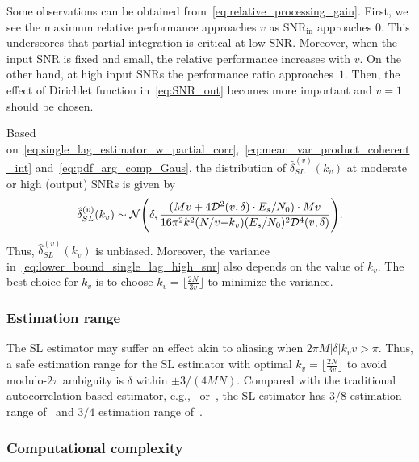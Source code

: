 Some observations can be obtained from~\eqref{eq:relative_processing_gain}.
First, we see the maximum relative performance approaches $v$ as
$\text{SNR}_{\text{in}}$ approaches 0.
This underscores that partial integration is critical at low SNR.
Moreover, when the input SNR is fixed and small, the relative performance
increases with $v$.
On the other hand, at high input SNRs the performance ratio approaches~$1$.
Then, the effect of Dirichlet function in~\eqref{eq:SNR_out}
becomes more important and
$v=1$ should be chosen.

Based on~\eqref{eq:single_lag_estimator_w_partial_corr},~\eqref{eq:mean_var_product_coherent_int}
and~\eqref{eq:pdf_arg_comp_Gaus},
the distribution of $\hat{\delta}_{SL}^{(v)}(k_v)$ at moderate or high
(output) SNRs is given by
\begin{equation}
  \label{eq:lower_bound_single_lag_high_snr}
  \hat{\delta}_{SL}^{(v)}(k_v) \sim \mathcal{N} \Bigg(\delta,\frac{(Mv+4\mathcal{D}^2(v,\delta)\cdot E_s/N_0)\cdot Mv}{16\pi^2k^2(N/v{-}k_v)(E_s/N_0)^2\mathcal{D}^4(v,\delta)}\Bigg).
\end{equation}
Thus, $\hat{\delta}_{SL}^{(v)}(k_v)$ is unbiased. 
Moreover, the variance in~\eqref{eq:lower_bound_single_lag_high_snr} also depends on
the value of $k_v$.
The best choice for $k_v$ is to choose 
$k_v=\lfloor\frac{2N}{3v}\rfloor$ to minimize the variance.

\subsubsection{Estimation range}
The SL estimator may suffer an effect
akin to aliasing when  $2\pi M|\delta|k_vv{>}\pi$.
Thus, a safe estimation range for the SL estimator with optimal
$k_v=\lfloor\frac{2N}{3v}\rfloor$
to avoid modulo-$2\pi$ ambiguity
is $\delta$ within $\pm 3/(4MN)$. 
Compared with the traditional autocorrelation-based estimator,
e.g.,~\cite{Luise_Reggiannini_95} or~\cite{Fitz_94},
the SL estimator has 
$3/8$ estimation range of~\cite{Luise_Reggiannini_95} and $3/4$ estimation range of~\cite{Fitz_94}.

\subsubsection{Computational complexity}

